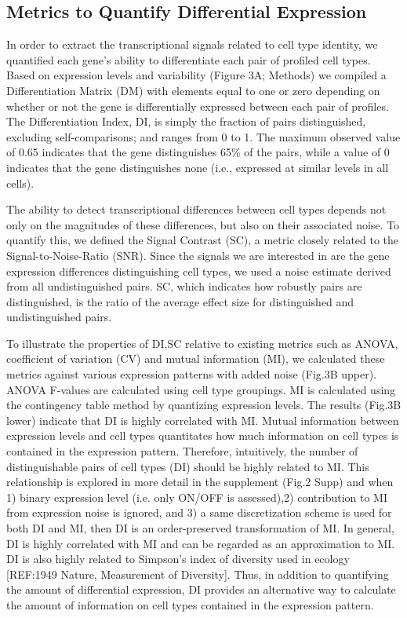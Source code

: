 \subsection{Metrics to Quantify Differential Expression}
In order to extract the transcriptional signals related to cell type identity, we quantified each gene's ability to differentiate each pair of profiled cell types. Based on expression levels and variability (Figure 3A; Methods) we compiled a Differentiation Matrix (DM) with elements equal to one or zero depending on whether or not the gene is differentially expressed between each pair of profiles. The Differentiation Index, DI, is simply the fraction of pairs distinguished, excluding self-comparisons; and ranges from 0 to 1. The maximum observed value of 0.65 indicates that the gene distinguishes 65\% of the pairs, while a value of 0 indicates that the gene distinguishes none (i.e., expressed at similar levels in all cells). 

The ability to detect transcriptional differences between cell types depends not only on the magnitudes of these differences, but also on their associated noise. To quantify this, we defined the Signal Contrast (SC), a metric closely related to the Signal-to-Noise-Ratio (SNR). Since the signals we are interested in are the gene expression differences distinguishing cell types, we used a noise estimate derived from all undistinguished pairs. SC, which indicates how robustly pairs are distinguished, is the ratio of the average effect size for distinguished and undistinguished pairs. 

To illustrate the properties of DI,SC relative to existing metrics such as ANOVA, coefficient of variation (CV) and mutual information (MI), we calculated these metrics against various expression patterns with added noise (Fig.3B upper). ANOVA F-values are calculated using cell type groupings. MI is calculated using the contingency table method by quantizing expression levels. 
The results (Fig.3B lower) indicate that DI is highly correlated with MI. Mutual information between expression levels and cell types quantitates how much information on cell types is contained in the expression pattern. Therefore, intuitively, the number of distinguishable pairs of cell types (DI) should be highly related to MI. This relationship is explored in more detail in the supplement (Fig.2 Supp) and when 1) binary expression level (i.e. only ON/OFF is assessed),2) contribution to MI from expression noise is ignored, and 3) a same discretization scheme is used for both DI and MI, then DI is an order-preserved transformation of MI. In general, DI is highly correlated with MI and can be regarded as an approximation to MI. DI is also highly related to Simpson's index of diversity used in ecology [REF:1949 Nature, Measurement of Diversity]. Thus, in addition to quantifying the amount of differential expression, DI provides an alternative way to calculate the amount of information on cell types contained in the expression pattern. 

